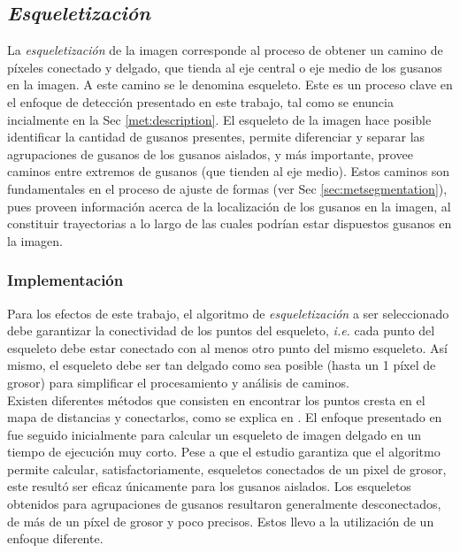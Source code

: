 \subsection{\emph{Esqueletizaci\'on}}
\label{sec:metsk}

La \emph{esqueletizaci\'on} de la imagen corresponde al proceso de obtener un 
camino de p\'ixeles conectado y delgado, que tienda
al eje central o eje medio de los gusanos en la imagen. A este camino se le
denomina esqueleto. Este es un proceso
clave en el enfoque de detecci\'on presentado en este trabajo, tal como
se enuncia incialmente en la Sec \ref{met:description}. El esqueleto de la
imagen hace posible identificar la cantidad de gusanos presentes, permite
diferenciar y separar las agrupaciones de gusanos de los gusanos aislados, 
y m\'as importante, provee caminos entre extremos de gusanos (que tienden
al eje medio). Estos caminos son fundamentales en el proceso de ajuste
de formas (ver Sec \ref{sec:metsegmentation}), pues proveen informaci\'on
acerca de la localizaci\'on de los gusanos en la imagen, al constituir trayectorias
a lo largo de las cuales podr\'ian estar dispuestos gusanos en la imagen.

\subsubsection*{Implementaci\'on}
\label{sec:skeletonimp}


Para los efectos de este trabajo, el algoritmo de \emph{esqueletizaci\'on} a ser
seleccionado debe garantizar la conectividad de los puntos del esqueleto, \emph{i.e.}
cada punto del esqueleto debe estar conectado con al menos otro punto del mismo
esqueleto. As\'i mismo, el esqueleto debe ser tan delgado como sea posible 
(hasta un 1 p\'ixel de grosor) para simplificar el procesamiento y an\'alisis de caminos.\\

Existen diferentes m\'etodos que consisten en encontrar los puntos cresta en el
mapa de distancias y conectarlos, como se explica en \cite{maxima,euclideancentre,ridgedt}. 
El enfoque presentado en \cite{maxima} fue seguido inicialmente para calcular un esqueleto
de imagen delgado en un tiempo de ejecuci\'on muy corto. Pese a que el estudio garantiza
que el algoritmo permite calcular, satisfactoriamente, esqueletos conectados de un pixel
de grosor, este result\'o ser eficaz \'unicamente para los gusanos aislados. Los esqueletos
obtenidos para agrupaciones de gusanos resultaron generalmente desconectados, 
de m\'as de un p\'ixel de grosor y poco precisos. Estos llevo a la utilizaci\'on
de un enfoque diferente.\\

